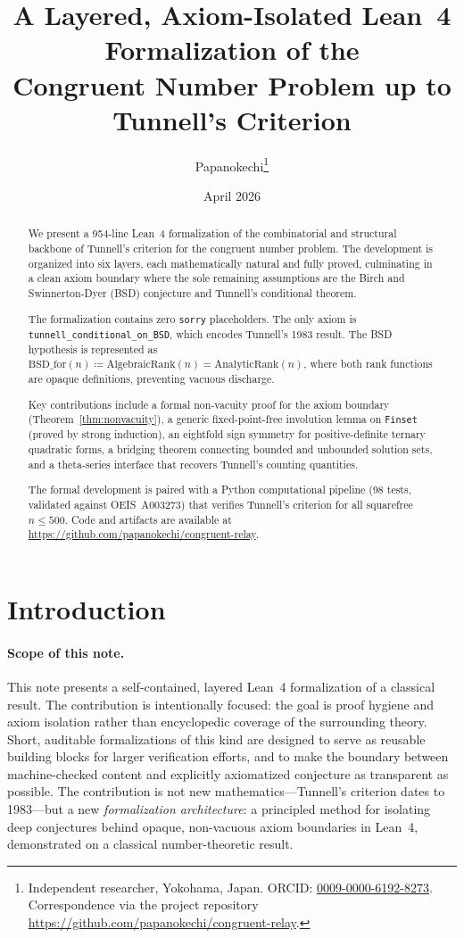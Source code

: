 \documentclass[11pt,a4paper]{article}
\title{%
  A Layered, Axiom-Isolated Lean~4 Formalization of the \\
  Congruent Number Problem up to Tunnell's Criterion%
}
\author{%
  Papanokechi\thanks{Independent researcher, Yokohama, Japan.
  ORCID: \href{https://orcid.org/0009-0000-6192-8273}{0009-0000-6192-8273}.
  Correspondence via the project repository
  \url{https://github.com/papanokechi/congruent-relay}.}%
}
\date{April 2026}
\theoremstyle{definition}
\newcommand{\lean}[1]{\texttt{#1}}
\newcommand{\BSDfor}{\mathrm{BSD\_for}}
\begin{document}
\maketitle

\begin{abstract}
We present a 954-line Lean~4 formalization of the combinatorial and
structural backbone of Tunnell's criterion for the congruent number
problem.  The development is organized into six layers, each
mathematically natural and fully proved, culminating in a clean axiom
boundary where the sole remaining assumptions are the Birch and
Swinnerton-Dyer (BSD) conjecture and Tunnell's conditional theorem.

The formalization contains zero \lean{sorry} placeholders.  The only
axiom is \lean{tunnell\_conditional\_on\_BSD}, which encodes
Tunnell's 1983 result.  The BSD hypothesis is represented as
$\BSDfor(n) \coloneqq \mathrm{AlgebraicRank}(n) =
\mathrm{AnalyticRank}(n)$, where both rank functions are opaque
definitions, preventing vacuous discharge.

Key contributions include a formal non-vacuity proof for the axiom
boundary (Theorem~\ref{thm:nonvacuity}), a generic fixed-point-free
involution lemma on \lean{Finset} (proved by strong induction), an
eightfold sign symmetry for positive-definite ternary quadratic
forms, a bridging theorem connecting bounded and unbounded solution
sets, and a theta-series interface that recovers Tunnell's counting
quantities.

The formal development is paired with a Python computational pipeline
(98 tests, validated against OEIS~A003273) that verifies Tunnell's
criterion for all squarefree~$n \le 500$.  Code and artifacts are
available at
\url{https://github.com/papanokechi/congruent-relay}.
\end{abstract}

\section{Introduction}\label{sec:intro}

\paragraph{Scope of this note.}
This note presents a self-contained, layered Lean~4 formalization of
a classical result.  The contribution is intentionally focused: the
goal is proof hygiene and axiom isolation rather than encyclopedic
coverage of the surrounding theory.  Short, auditable formalizations
of this kind are designed to serve as reusable building blocks for
larger verification efforts, and to make the boundary between
machine-checked content and explicitly axiomatized conjecture as
transparent as possible.  The contribution is not new
mathematics---Tunnell's criterion dates to 1983---but a new
\emph{formalization architecture}: a principled method for isolating
deep conjectures behind opaque, non-vacuous axiom boundaries in
Lean~4, demonstrated on a classical number-theoretic result.
\end{document}
